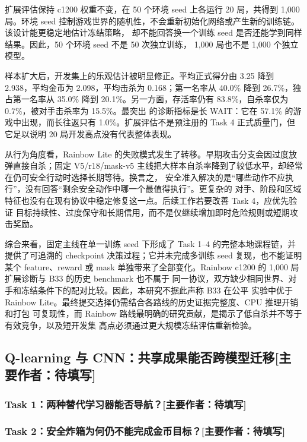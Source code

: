 \documentclass[UTF8,11pt,a4paper,fontset=none]{ctexart}
\newcommand{\primaryauthor}[1]{\texorpdfstring{\enspace\normalfont\small[主要作者：#1]}{ [主要作者：#1]}}
\newcommand{\authorsubsection}[2]{\subsection{#1\primaryauthor{#2}}}
\newcommand{\authorsubsubsection}[2]{\subsubsection{#1\primaryauthor{#2}}}
\newcommand{\pendingauthor}{待填写}
\newif\ifdraftguidance
\newcommand{\writingnote}[1]{%
  \ifdraftguidance
    \par\noindent\begingroup\color{promptblue}\small
    \fbox{\begin{minipage}{0.94\linewidth}\textbf{写作提示：}#1\end{minipage}}%
    \par\endgroup
  \fi
}
\newcommand{\todoitem}[1]{%
  \ifdraftguidance\textcolor{promptblue}{\textbf{[待补：#1]}}\fi
}
\begin{document}
扩展评估保持 c1200 权重不变，在 50 个环境 seed 上各运行 20 局，共得到 1,000 局。环境 seed
控制游戏世界的随机性，不会重新初始化网络或产生新的训练链。该设计能更稳定地估计冻结策略，
却不能回答换一个训练 seed 是否还能学到同样结果。因此，50 个环境 seed 不是 50 次独立训练，
1,000 局也不是 1,000 个独立模型。

样本扩大后，开发集上的乐观估计被明显修正。平均正式得分由 3.25 降到 2.938，平均金币为
2.098，平均击杀为 0.168；第一名率从 40.0\% 降到 26.7\%，独占第一名率从 35.0\% 降到
20.1\%。另一方面，存活率仍有 83.8\%，自杀率仅为 0.7\%，被对手击杀率为 15.5\%。最突出
的诊断指标是长 WAIT：它在 57.1\% 的游戏中出现，而长往返只有 1.0\%。扩展评估不是预注册的
Task 4 正式质量门，但它足以说明 20 局开发高点没有代表整体表现。

从行为角度看，Rainbow Lite 的失败模式发生了转移。早期攻击分支会因过度放弹直接自杀；固定
V5/r18/mask-v5 主线把大样本自杀率降到了较低水平，却经常在仍可安全行动时选择长期等待。换言之，
安全准入解决的是“哪些动作不应执行”，没有回答“剩余安全动作中哪一个最值得执行”。更复杂的
对手、阶段和区域特征也没有在现有协议中稳定修复这一点。后续工作若要改善 Task 4，应优先验证
目标持续性、过度保守和长期信用，而不是仅继续增加即时危险规则或短期攻击奖励。

综合来看，固定主线在单一训练 seed 下形成了 Task 1--4 的完整本地课程链，并提供了可追溯的
checkpoint 决策过程；它并未完成多训练 seed 复现，也不能证明某个 feature、reward 或 mask
单独带来了全部变化。Rainbow c1200 的 1,000 局扩展诊断与 B33 的历史 benchmark 也不属于
同一协议，双方缺少相同世界、对手和冻结条件下的配对比较。因此，本研究不据此声称 B33 在公平
实验中优于 Rainbow Lite。最终提交选择仍需结合各路线的历史证据完整度、CPU 推理开销和打包
可复现性，而 Rainbow 路线最明确的研究贡献，是揭示了低自杀并不等于有效竞争，以及短开发集
高点必须通过更大规模冻结评估重新检验。

\authorsubsection{Q-learning 与 CNN：共享成果能否跨模型迁移}{\pendingauthor}

\authorsubsubsection{Task 1：两种替代学习器能否导航？}{\pendingauthor}
\writingnote{按统一七步叙事写作。Double Q($\lambda$) 为 48.95 coins、96\% all-coins；Distilled CNN 为 49.84 coins、96\% all-coins；额外 TD fine-tuning 退化到 37.21 coins、55\% all-coins。}
\todoitem{正文}

\authorsubsubsection{Task 2：安全炸箱为何仍不能完成金币目标？}{\pendingauthor}
\writingnote{按统一七步叙事写作。Q r20 为 3.95/9 coins、53.45 crates、0\% suicide、75\% long ping-pong；CNN D02 为 2.60/9 coins、44.15 crates、0\% suicide、0\% all-coins；共同瓶颈是箱后长期目标重选；两者未通过 Task 2，因此停止进入 Task 3/4。}
\todoitem{正文与 Table 3：Q/CNN Task 1--2 代表结果}
\end{document}
